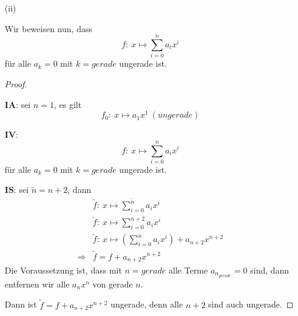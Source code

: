 \begin{enumerate}
\begin{enumerate}
\begin{proof}
$\mathbf{IA}$:
sei $n=0$, es gilt
\begin{equation*}
f_0:\ x\mapsto a_0\ (gerade)
\end{equation*}

$\mathbf{IV}$:
\begin{equation*}
f:\ x\mapsto\sum_{i=0}^n a_ix^i
\end{equation*}
für alle $a_k=0$ mit $k=ungerade$ gerade ist.

$\mathbf{IS}$:
sei $\tilde{n}=n+2$, dann
\begin{align*}
&\tilde{f}:\ x\mapsto\sum_{i=0}^{\tilde{n}} a_ix^i\\
&\tilde{f}:\ x\mapsto\sum_{i=0}^{n+2} a_ix^i\\
&\tilde{f}:\ x\mapsto(\sum_{i=0}^{n} a_ix^i)+a_{n+2}x^{n+2}\\
\Rightarrow & \tilde{f}=f+a_{n+2}x^{n+2}
\end{align*}
Die Voraussetzung ist, dass mit $n=ungerade$ alle Terme $a_{n_{ungerade}}=0$ sind, dann entfernen wir alle $a_nx^n$ von ungerade $n$.

Dann ist $\tilde{f}=f+a_{n+2}x^{n+2}$ gerade, denn alle $n+2$ sind auch gerade.
\end{proof}

\newpage

\item[(ii)]

Wir beweisen nun, dass
\begin{equation*}
f:\ x\mapsto\sum_{i=0}^n a_ix^i
\end{equation*}
für alle $a_k=0$ mit $k=gerade$ ungerade ist.

\begin{proof}
$ $\newline

$\mathbf{IA}$:
sei $n=1$, es gilt
\begin{equation*}
f_0:\ x\mapsto a_1x^1\ (ungerade)
\end{equation*}

$\mathbf{IV}$:
\begin{equation*}
f:\ x\mapsto\sum_{i=0}^n a_ix^i
\end{equation*}
für alle $a_k=0$ mit $k=gerade$ ungerade ist.

$\mathbf{IS}$:
sei $\tilde{n}=n+2$, dann
\begin{align*}
&\tilde{f}:\ x\mapsto\sum_{i=0}^{\tilde{n}} a_ix^i\\
&\tilde{f}:\ x\mapsto\sum_{i=0}^{n+2} a_ix^i\\
&\tilde{f}:\ x\mapsto(\sum_{i=0}^{n} a_ix^i)+a_{n+2}x^{n+2}\\
\Rightarrow & \tilde{f}=f+a_{n+2}x^{n+2}
\end{align*}
Die Voraussetzung ist, dass mit $n=gerade$ alle Terme $a_{n_{gerade}}=0$ sind, dann entfernen wir alle $a_nx^n$ von gerade $n$.

Dann ist $\tilde{f}=f+a_{n+2}x^{n+2}$ ungerade, denn alle $n+2$ sind auch ungerade.
\end{proof}

\end{enumerate}

\end{enumerate}

